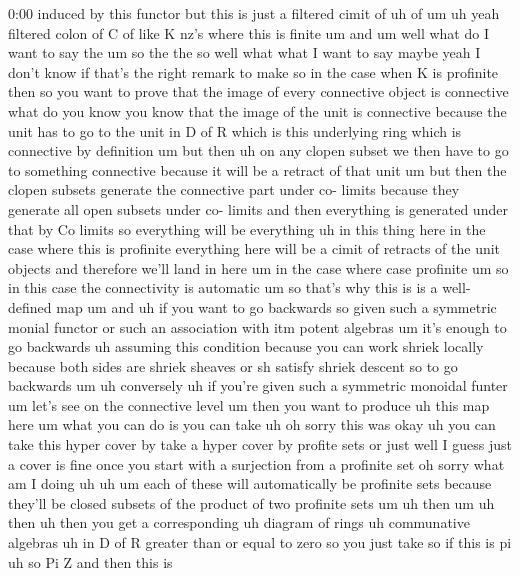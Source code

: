 \begin{unfinished}{0:00}
induced  by  this  functor  but  this  is  just
a  filtered
cimit  of
uh  of
um
uh  yeah  filtered  colon  of  C  of  like  K
nz's  where  this  is
finite
um  and
um
well  what  do  I  want  to  say  the
um  so  the  the  so  well  what  what  I  want
to  say  maybe  yeah  I  don't  know  if  that's
the  right  remark  to  make  so  in  the  case
when  K  is  profinite  then  so  you  want  to
prove  that  the  image  of  every  connective
object  is  connective  what  do  you  know
you  know  that  the  image  of  the  unit  is
connective  because  the  unit  has  to  go  to
the  unit  in  D  of  R  which  is  this
underlying  ring  which  is  connective  by
definition  um  but  then  uh  on  any  clopen
subset  we  then  have  to  go  to  something
connective  because  it  will  be  a  retract
of  that  unit  um  but  then  the  clopen
subsets  generate  the  connective  part
under  co-  limits  because  they  generate
all  open  subsets  under  co-  limits  and
then  everything  is  generated  under  that
by  Co  limits  so  everything  will  be
everything  uh  in  this  thing  here  in  the
case  where  this  is  profinite  everything
here  will  be  a  cimit  of  retracts  of  the
unit  objects  and  therefore  we'll  land  in
here  um  in  the  case  where  case
profinite  um
so  in  this
case  the  connectivity  is
automatic  um  so  that's  why  this  is  is  a
well-defined
map
um  and  uh  if  you  want  to  go  backwards  so
given  such  a  symmetric  monial  functor  or
such  an  association  with  itm  potent
algebras  um  it's  enough  to  go  backwards
uh  assuming  this  condition  because  you
can  work  shriek  locally  because  both
sides  are  shriek  sheaves  or  sh  satisfy
shriek  descent  so  to  go
backwards
um  uh
conversely  uh  if  you're  given  such  a
symmetric  monoidal
funter
um  let's
see  on  the  connective  level  um  then  you
want  to  produce  uh  this  map  here  um  what
you  can  do  is  you  can  take  uh  oh  sorry
this  was  okay  uh  you  can  take  this  hyper
cover  by  take  a  hyper  cover  by  profite
sets  or  just  well  I  guess  just  a  cover
is
fine  once  you  start  with  a  surjection
from  a  profinite  set  oh  sorry  what  am  I
doing  uh
uh  um  each  of  these  will  automatically
be  profinite  sets  because  they'll  be
closed  subsets  of  the  product  of  two
profinite
sets
um  uh  then
um
uh
then  uh  then  you  get  a
corresponding  uh  diagram  of
rings  uh  communative
algebras  uh  in  D  of  R  greater  than  or
equal  to  zero  so  you  just  take  so  if
this  is  pi  uh  so  Pi  Z  and  then  this  is

\end{unfinished}

